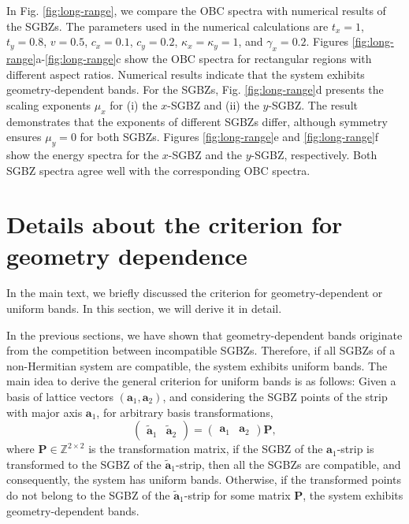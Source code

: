 In Fig. \ref{fig:long-range}, we compare the OBC spectra with numerical
results of the SGBZs. The parameters used in the numerical calculations
are $t_{x}=1$, $t_{y}=0.8$, $v=0.5$, $c_{x}=0.1$, $c_{y}=0.2$,
$\kappa_{x}=\kappa_{y}=1$, and $\gamma_{x}=0.2$. Figures \ref{fig:long-range}a-\ref{fig:long-range}c
show the OBC spectra for rectangular regions with different aspect
ratios. Numerical results indicate that the system exhibits geometry-dependent
bands. For the SGBZs, Fig. \ref{fig:long-range}d presents the scaling
exponents $\mu_{x}$ for (i) the $x$-SGBZ and (ii) the $y$-SGBZ.
The result demonstrates that the exponents of different SGBZs differ,
although symmetry ensures $\mu_{y}=0$ for both SGBZs. Figures \ref{fig:long-range}e
and \ref{fig:long-range}f show the energy spectra for the $x$-SGBZ
and the $y$-SGBZ, respectively. Both SGBZ spectra agree well with
the corresponding OBC spectra.

\section{Details about the criterion for geometry dependence}

\label{sec:details-criterion}

In the main text, we briefly discussed the criterion for geometry-dependent
or uniform bands. In this section, we will derive it in detail.

In the previous sections, we have shown that geometry-dependent bands
originate from the competition between incompatible SGBZs. Therefore,
if all SGBZs of a non-Hermitian system are compatible, the system
exhibits uniform bands. The main idea to derive the general criterion
for uniform bands is as follows: Given a basis of lattice vectors
$(\mathbf{a}_{1},\mathbf{a}_{2})$, and considering the SGBZ points
of the strip with major axis $\mathbf{a}_{1}$, for arbitrary basis
transformations, 
\begin{equation}
\begin{pmatrix}\tilde{\mathbf{a}}_{1} & \tilde{\mathbf{a}}_{2}\end{pmatrix}=\begin{pmatrix}\mathbf{a}_{1} & \mathbf{a}_{2}\end{pmatrix}\mathbf{P},
\end{equation}
where $\mathbf{P}\in\mathbb{Z}^{2\times2}$ is the transformation
matrix, if the SGBZ of the $\mathbf{a}_{1}$-strip is transformed
to the SGBZ of the $\tilde{\mathbf{a}}_{1}$-strip, then all the SGBZs
are compatible, and consequently, the system has uniform bands. Otherwise,
if the transformed points do not belong to the SGBZ of the $\tilde{\mathbf{a}}_{1}$-strip
for some matrix $\mathbf{P}$, the system exhibits geometry-dependent
bands.

